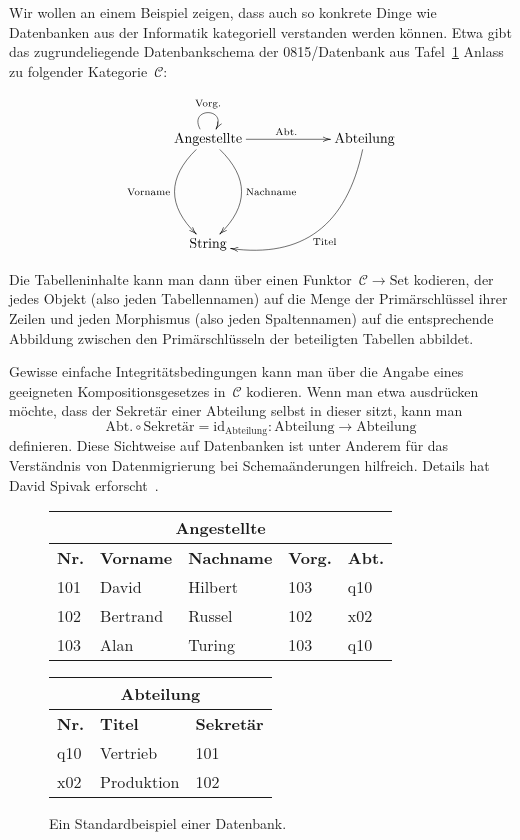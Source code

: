 \documentclass[a4paper,ngerman]{scrartcl}
\theoremstyle{definition}
\theoremstyle{plain}
\theoremstyle{remark}
\newcommand{\C}{\mathcal{C}}
\newcommand{\id}{\mathrm{id}}
\newcommand{\Set}{\mathrm{Set}}
\begin{document}
Wir wollen an einem Beispiel zeigen, dass auch so konkrete Dinge wie
Datenbanken aus der Informatik kategoriell verstanden werden können. Etwa gibt
das zugrundeliegende Datenbankschema der 0815/Datenbank aus Tafel~\ref{db0815}
Anlass zu folgender Kategorie~$\C$:

\[ \xymatrixcolsep{5pc} \xymatrixrowsep{5pc} \xymatrix{
  \text{Angestellte}
    \ar@(ul,ur)^{\text{Vorg.}}
    \ar[r]^{\text{Abt.}}
    \ar@/^2pc/[d]^{\text{Nachname}}
    \ar@/_2pc/[d]_{\text{Vorname}}
  & \text{Abteilung}
    \ar@/^3pc/[dl]^{\text{Titel}} \\
  \text{String}
} \]

Die Tabelleninhalte kann man dann über einen Funktor~$\C \to \Set$ kodieren,
der jedes Objekt (also jeden Tabellennamen) auf die Menge der Primärschlüssel
ihrer Zeilen und jeden Morphismus (also jeden Spaltennamen) auf die
entsprechende Abbildung zwischen den Primärschlüsseln der beteiligten Tabellen
abbildet.

Gewisse einfache Integritätsbedingungen kann man über die Angabe eines
geeigneten Kompositionsgesetzes in~$\C$ kodieren. Wenn man etwa ausdrücken
möchte, dass der Sekretär einer Abteilung selbst in dieser sitzt, kann man
\[ \text{Abt.} \circ \text{Sekretär} = \id_{\text{Abteilung}} :
  \text{Abteilung} \to \text{Abteilung} \]
definieren. Diese Sichtweise auf Datenbanken ist unter Anderem für das
Verständnis von Datenmigrierung bei Schemaänderungen hilfreich. Details hat
David Spivak erforscht~\cite{spivak1,spivak2,spivak3}.

\begin{figure}
  \begin{center}
    \small
    \begin{tabular}{|l||l|l|l|l|}
      \hline
      \multicolumn{5}{|c|}{Angestellte} \\ \hline
      \textbf{Nr.} & \textbf{Vorname} & \textbf{Nachname} & \textbf{Vorg.} & \textbf{Abt.} \\ \hline
      101 & David & Hilbert & 103 & q10 \\
      102 & Bertrand & Russel & 102 & x02 \\
      103 & Alan & Turing & 103 & q10 \\
      \hline
    \end{tabular}
    \quad
    \begin{tabular}{|l||l|l|}
      \hline
      \multicolumn{3}{|c|}{Abteilung} \\ \hline
      \textbf{Nr.} & \textbf{Titel} & \textbf{Sekretär} \\ \hline
      q10 & Vertrieb & 101 \\
      x02 & Produktion & 102 \\
      \hline
    \end{tabular}
  \end{center}

  \caption{\label{db0815}Ein Standardbeispiel einer Datenbank.}
\end{figure}
\end{document}
